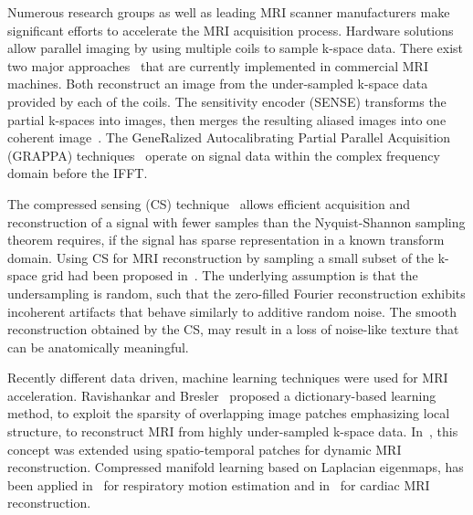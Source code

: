 \documentclass[review]{elsarticle}
\begin{document}
Numerous research groups as well as leading MRI scanner manufacturers make significant efforts to accelerate the MRI acquisition process. Hardware solutions allow parallel imaging by using multiple coils \cite{roemer1990nmr} to sample k-space data. There exist two major approaches~\cite{Deshmane2012} that are currently implemented in commercial MRI machines. Both reconstruct an image from the under-sampled k-space data provided by each of the coils. The sensitivity encoder (SENSE) transforms the partial k-spaces into images, then merges the resulting aliased images into one coherent image~\cite{pruessmann1999sense}. 
The GeneRalized Autocalibrating Partial Parallel Acquisition (GRAPPA) techniques~\cite{griswold2002generalized} operate on signal data within the complex frequency domain before the IFFT.

The compressed sensing (CS) technique~\cite{donoho2006compressed} allows efficient acquisition and reconstruction of a signal with fewer samples than the Nyquist-Shannon sampling theorem requires, if the signal has sparse representation in a known transform domain. Using CS for MRI reconstruction by sampling a small subset of the k-space grid had been proposed in~\cite{lustig2007sparse}. The underlying assumption is that the undersampling is random, such that the zero-filled Fourier reconstruction exhibits incoherent artifacts that behave similarly to additive random noise. 
The smooth reconstruction obtained by the CS, may result in a loss of noise-like texture that can be anatomically meaningful.
 
Recently different data driven, machine learning techniques were used for MRI acceleration. 
Ravishankar and Bresler~\cite{ravishankar2011mr} proposed a dictionary-based learning method, to exploit the sparsity of overlapping image patches emphasizing local structure, to reconstruct MRI from highly under-sampled k-space data. In~\cite{caballero2014dictionary}, this concept was extended using spatio-temporal patches for dynamic MRI reconstruction.
Compressed manifold learning based on Laplacian eigenmaps, has been applied in~\cite{usman2014compressive} for respiratory motion estimation and in~\cite{bhatia2015fast} for cardiac MRI reconstruction.
\end{document}
